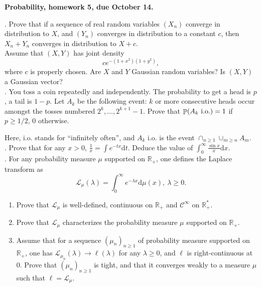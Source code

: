 \documentclass[11pt,reqno]{amsart}
\DeclareMathOperator{\Prob}{\mathbb{P}}   %
\newcommand{\1}{\mathds{1}}
\newcommand{\rd}{{\mathrm{d}}}            %
\theoremstyle{definition}
\theoremstyle{remark}
\numberwithin{equation}{section}
\begin{document}
\begin{center}
{\bf Probability, homework 5, due October 14.}
\end{center}
\vspace{0.5cm}
\small

.
Prove that if a sequence of real random variables $(X_n)$ converge in distribution to $X$, and $(Y_n)$ converges in distribution to a constant $c$, then $X_n+Y_n$ converges in distribution to $X+c$.\\


Assume that $(X,Y)$ has joint density 
$$
c e^{-(1+x^2)(1+y^2)},
$$
where $c$ is properly chosen.
Are $X$ and $Y$ Gaussian random variables? Is $(X,Y)$ a Gaussian vector?
\\




. You toss a coin repeatedly and independently. The probability to get a head is $p$, a tail is $1-p$.
Let $A_k$ be the following event: $k$ or more consecutive heads occur amongst the tosses numbered 
$2^k,\dots,2^{k+1}-1$. Prove that
$\Prob(A_k\ {\rm i.o.})=1$ if $p\geq 1/2$, $0$ otherwise.

Here, i.o. stands for ``infinitely often'', and $A_k$ i.o. is the event $\cap_{n\geq 1} \cup_{m\geq n} A_m$.\\


.  Prove that for any $x>0$, $\frac{1}{x}=\int e^{-tx}\rd t$.  Deduce the value of $\int_0^{\infty}\frac{\sin x}{x}\rd x$.\\





.  For any probability measure $\mu$ supported on $\mathbb{R}_+$,  one defines the Laplace transform as
$$
\mathscr{L}_\mu(\lambda)=\int_0^\infty e^{-\lambda x} \rd \mu(x),\ \lambda\geq 0.
$$
\begin{enumerate}[(1)]
\item Prove that $\mathscr{L}_\mu$ is well-defined,  continuous on $\mathbb{R}_+$ and $\mathscr{C}^\infty$ on 
$\mathbb{R}_+^*$.
\item Prove that $\mathscr{L}_\mu$ characterizes the probability measure $\mu$  supported on $\mathbb{R}_+$.
\item Assume that for a sequence $(\mu_n)_{n\geq 1}$ of probability measure  supported on $\mathbb{R}_+$, one has $\mathscr{L}_{\mu_n}(\lambda)\to \ell(\lambda)$ for any $\lambda\geq 0$, and $\ell$ is right-continuous at $0$.
Prove that $(\mu_n)_{n\geq 1}$ is tight,  and that it converges weakly to a measure $\mu$ such that $\ell=\mathscr{L}_\mu$.
\end{enumerate}
\end{document}

